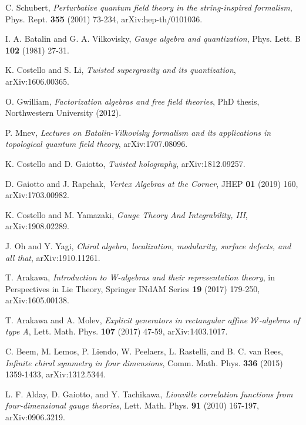 \begin{thebibliography}{99}
C. Schubert, \emph{Perturbative quantum field theory in the string-inspired formalism}, 
Phys. Rept. \textbf{355} (2001) 73-234, arXiv:hep-th/0101036.


I. A. Batalin and G. A. Vilkovisky, \emph{Gauge algebra and quantization}, 
Phys. Lett. B \textbf{102} (1981) 27-31.

K. Costello and S. Li, \emph{Twisted supergravity and its quantization}, 
arXiv:1606.00365.

O. Gwilliam, \emph{Factorization algebras and free field theories}, 
PhD thesis, Northwestern University (2012).

P. Mnev, \emph{Lectures on Batalin-Vilkovisky formalism and its applications 
in topological quantum field theory}, arXiv:1707.08096.


K. Costello and D. Gaiotto, \emph{Twisted holography}, 
arXiv:1812.09257.

D. Gaiotto and J. Rapchak, \emph{Vertex Algebras at the Corner}, 
JHEP \textbf{01} (2019) 160, arXiv:1703.00982.

K. Costello and M. Yamazaki, \emph{Gauge Theory And Integrability, III}, 
arXiv:1908.02289.

J. Oh and Y. Yagi, \emph{Chiral algebra, localization, modularity, surface defects, 
and all that}, arXiv:1910.11261.


T. Arakawa, \emph{Introduction to W-algebras and their representation theory}, 
in Perspectives in Lie Theory, Springer INdAM Series \textbf{19} (2017) 179-250, 
arXiv:1605.00138.

T. Arakawa and A. Molev, \emph{Explicit generators in rectangular affine 
$\mathcal{W}$-algebras of type A}, 
Lett. Math. Phys. \textbf{107} (2017) 47-59, arXiv:1403.1017.

C. Beem, M. Lemos, P. Liendo, W. Peelaers, L. Rastelli, and B. C. van Rees, 
\emph{Infinite chiral symmetry in four dimensions}, 
Comm. Math. Phys. \textbf{336} (2015) 1359-1433, arXiv:1312.5344.

L. F. Alday, D. Gaiotto, and Y. Tachikawa, \emph{Liouville correlation functions 
from four-dimensional gauge theories}, 
Lett. Math. Phys. \textbf{91} (2010) 167-197, arXiv:0906.3219.


\end{thebibliography}
